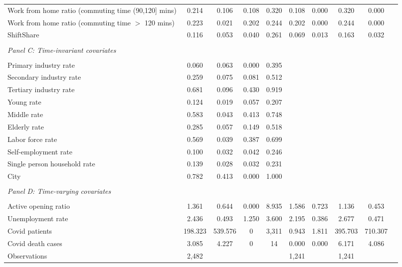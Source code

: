 \begin{tabular}{l*{9}{c}}
Work from home ratio (commuting time (90,120] mins)&       0.214&       0.106&       0.108&       0.320&       0.108&       0.000&       0.320&       0.000\\
Work from home ratio (commuting time $>$ 120 mins)&       0.223&       0.021&       0.202&       0.244&       0.202&       0.000&       0.244&       0.000\\
ShiftShare          &       0.116&       0.053&       0.040&       0.261&       0.069&       0.013&       0.163&       0.032\\
\\ \multicolumn{1}{l}{\textit{Panel C: Time-invariant covariates}} \\\\[-1ex]
Primary industry rate&       0.060&       0.063&       0.000&       0.395\\
Secondary industry rate&       0.259&       0.075&       0.081&       0.512\\
Tertiary industry rate&       0.681&       0.096&       0.430&       0.919\\
Young rate          &       0.124&       0.019&       0.057&       0.207\\
Middle rate         &       0.583&       0.043&       0.413&       0.748\\
Elderly rate        &       0.285&       0.057&       0.149&       0.518\\
Labor force rate    &       0.569&       0.039&       0.387&       0.699\\
Self-employment rate&       0.100&       0.032&       0.042&       0.246\\
Single person household rate&       0.139&       0.028&       0.032&       0.231\\
City                &       0.782&       0.413&       0.000&       1.000\\
\\ \multicolumn{1}{l}{\textit{Panel D: Time-varying covariates}} \\\\[-1ex]
Active opening ratio&       1.361&       0.644&       0.000&       8.935&       1.586&       0.723&       1.136&       0.453\\
Unemployment rate   &       2.436&       0.493&       1.250&       3.600&       2.195&       0.386&       2.677&       0.471\\
Covid patients      &     198.323&     539.576&           0&       3,311&       0.943&       1.811&     395.703&     710.307\\
Covid death cases   &       3.085&       4.227&           0&          14&       0.000&       0.000&       6.171&       4.086\\
\midrule
Observations        &       2,482&            &            &            &       1,241&            &       1,241&            \\
\bottomrule \end{tabular}
